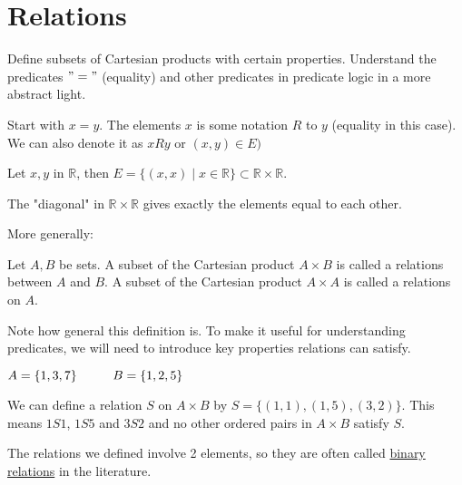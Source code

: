 \documentclass[10pt]{article}
\begin{document}
	\section{Relations}
	\begin{description}
		\item[Task:] Define subsets of Cartesian products with certain properties. Understand the predicates $"="$ (equality) and other predicates in predicate logic in a more abstract light.
		\item Start with $x=y$. The elements $x$ is some notation $R$ to $y$ (equality in this case). We can also denote it as $xRy$ or $(x, y) \in E)$
		\item Let $x, y$ in $\mathbb{R}$, then $E = \{(x, x) \mid x \in \mathbb{R} \} \subset \mathbb{R} \times \mathbb{R}$.
		\item The "diagonal" in $\mathbb{R} \times \mathbb{R}$ gives exactly the elements equal to each other.
		\item More generally:
		\item[Definition:] Let $A, B$ be sets. A subset of the Cartesian product $A \times B$ is called a relations between $A$ and $B$. A subset of the Cartesian product $A \times A$ is called a relations on $A$.
		\item[Remark:] Note how general this definition is. To make it useful for understanding predicates, we will need to introduce key properties relations can satisfy.
		\item[Example:] $A = \{1, 3, 7\} \hspace{10mm} B = \{1, 2, 5\}$
		\item We can define a relation $S$ on $A \times B$ by $S = \{(1, 1), (1, 5), (3, 2)\}$. This means $1S1$, $1S5$ and $3S2$ and no other ordered pairs in $A \times B$ satisfy $S$.
		\item[Remark:] The relations we defined involve 2 elements, so they are often called \underline{binary relations} in the literature.
	\end{description}
	
\end{document}
